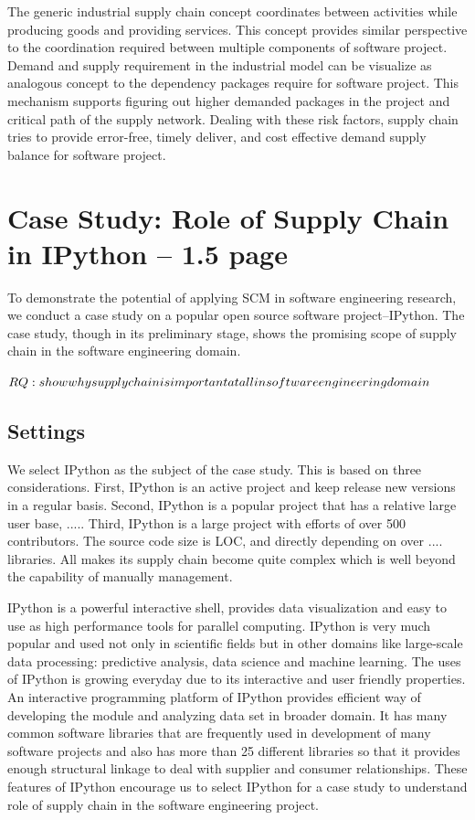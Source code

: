 \documentclass[10pt,conference]{IEEEtran}
\begin{document}
 The generic industrial supply chain concept coordinates between activities while producing goods and providing services. This concept provides similar perspective to the coordination required between multiple components of software project. Demand and supply requirement in the industrial model can be visualize as analogous concept to the dependency packages require for software project. This mechanism supports figuring out higher demanded packages in the project and critical path of the supply network. Dealing with these risk factors, supply chain tries to provide error-free, timely deliver, and cost effective demand supply balance for software project. 


\section{Case Study: Role of Supply Chain in IPython -- 1.5 page}
To demonstrate the potential of applying SCM in software engineering research, we conduct a case study on a popular open source software project--IPython. The case study, though in its preliminary stage, shows the promising scope of supply chain in the software engineering domain.


$RQ : show why supply chain is important at \\all in software engineering domain$

\subsection{Settings}

We select IPython as the subject of the case study. This is based on three considerations. First, IPython is an active project and keep release new versions in a regular basis. Second, IPython is a popular project that has a relative large user base, ..... Third, IPython is a large project with efforts of over 500 contributors. The source code size is LOC, and directly depending on over .... libraries. All makes its supply chain become quite complex which is well beyond the capability of manually management. 

IPython \cite{} is a powerful interactive shell, provides data visualization and easy to use as high performance tools for parallel computing. IPython is very much popular and used not only in scientific fields but in other domains like large-scale data processing: predictive analysis, data science and machine learning. The uses of IPython is growing everyday due to its interactive and user friendly properties. An interactive programming platform of IPython provides efficient way of developing the module and analyzing data set in broader domain. It has many common software libraries that are frequently used in development of many software projects and also has more than 25 different libraries so that it provides enough structural linkage to deal with supplier and consumer relationships.  These features of IPython encourage us to select IPython for a case study to understand role of supply chain in the software engineering project.
\end{document}
